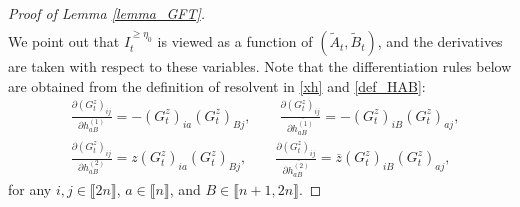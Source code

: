 \documentclass[10pt,reqno]{amsart}
\newcommand{\<}{\langle}
\renewcommand{\>}{\rangle}
\numberwithin{equation}{section}
\begin{document}
\begin{proof}[Proof of Lemma \ref{lemma_GFT}]
\begin{align}
\end{align}
We point out that $I_t^{\geq \eta_0}$ is viewed
as a function of $(\widetilde A_t, \widetilde B_t)$,
and the derivatives are taken with respect
to these variables.
Note that the differentiation rules below are obtained from the definition of resolvent in \eqref{xh} and \eqref{def_HAB}:
	\begin{align}
    &\frac{\partial (G^z_t)_{ij}}{\partial h^{(1)}_{aB}}=-(G^z_t)_{ia} (G^z_t)_{Bj}, \qquad \frac{\partial (G^z_t)_{ij}}{\partial \overline{h^{(1)}_{aB}}}=-(G^z_t)_{iB} (G^z_t)_{aj},\label{eq_diff_1}\\
    &\frac{\partial (G^z_t)_{ij}}{\partial h^{(2)}_{aB}}=z(G^z_t)_{ia} (G^z_t)_{Bj}, \qquad \frac{\partial (G^z_t)_{ij}}{\partial \overline{h^{(2)}_{aB}}}=\overline{z} (G^z_t)_{iB} (G^z_t)_{aj},\label{eq_diff_2}
    \end{align}
for any $i,j \in \llbracket 2n \rrbracket $, $a \in 
\llbracket n \rrbracket$, and 
$B\in \llbracket n+1,2n \rrbracket$.  



\end{proof}
\end{document}
